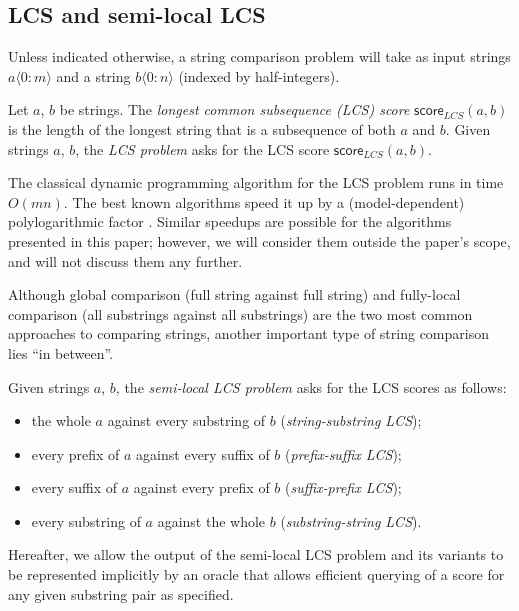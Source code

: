 \documentclass[a4paper,UKenglish,cleveref]{lipics-v2021}
\newcommand{\ang}[1]{\langle#1\rangle}
\begin{document}
\subsection{LCS and semi-local LCS}

Unless indicated otherwise, a string comparison problem will take as input 
strings $a\ang{0:m}$ and a string $b\ang{0:n}$ (indexed by half-integers).
%
\begin{definition}
\label{def-lcs}
%
Let $a$, $b$ be strings.
The \emph{longest common subsequence (LCS) score} $\mathsf{score}_{LCS}(a,b)$
is the length of the longest string that is a subsequence of both $a$ and $b$.
Given strings $a$, $b$, the \emph{LCS problem} asks for the LCS score $\mathsf{score}_{LCS}(a,b)$.
%
\end{definition}
%
The classical dynamic programming algorithm for the LCS problem 
\cite{Needleman_Wunsch:70,Wagner_Fischer:74} runs in time $O(mn)$.
The best known algorithms speed it up by a (model-dependent) polylogarithmic factor
\cite{Masek_Paterson:80,Crochemore+:03_SIAM,Bille_Farach:08}.
Similar speedups are possible for the algorithms presented in this paper;
however, we will consider them outside the paper's scope, 
and will not discuss them any further.

Although global comparison (full string against full string)
and fully-local comparison (all substrings against all substrings)
are the two most common approaches to comparing strings,
another important type of string comparison lies ``in between''.
%
\begin{definition}
\label{def-slcs}
%
Given strings $a$, $b$, the \emph{semi-local LCS problem}
asks for the LCS scores as follows:
%
\begin{itemize}
%
\item the whole $a$ against every substring of $b$
(\emph{string-substring LCS});
%
\item every prefix of $a$ against every suffix of $b$
(\emph{prefix-suffix LCS});
%
\item every suffix of $a$ against every prefix of $b$
(\emph{suffix-prefix LCS});
%
\item every substring of $a$ against the whole $b$
(\emph{substring-string LCS}).
%
\end{itemize}
%
\end{definition}
%
Hereafter, we allow the output of the semi-local LCS problem and its variants
to be represented implicitly by an oracle 
that allows efficient querying of a score for any given substring pair as specified.
\end{document}
